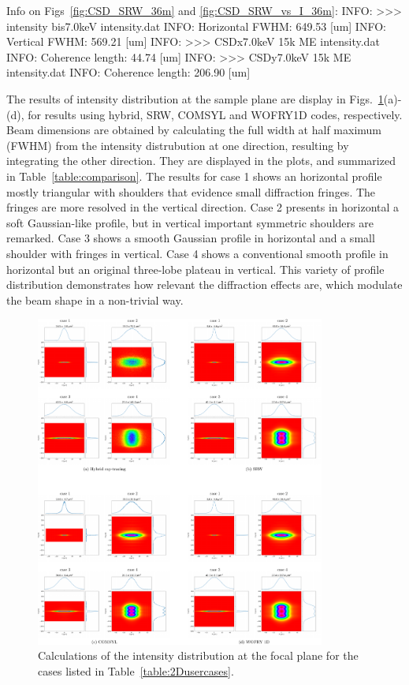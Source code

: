 \documentclass{iucr}              %
\newcommand{\inred}[1]{{\color{red}#1}}
\begin{document}
\inred{Info on Figs~\ref{fig:CSD_SRW_36m} and \ref{fig:CSD_SRW_vs_I_36m}:}
INFO: >>> intensity bis7.0keV intensity.dat
INFO: Horizontal FWHM: 649.53 [um]
INFO: Vertical FWHM: 569.21 [um]
INFO: >>> CSDx7.0keV 15k ME intensity.dat
INFO: Coherence length: 44.74 [um]
INFO: >>> CSDy7.0keV 15k ME intensity.dat
INFO: Coherence length: 206.90 [um]


The results of intensity distribution at the sample plane are display in Figs.~\ref{fig:sim_results}(a)-(d), for results using hybrid, SRW, COMSYL and WOFRY1D codes, respectively.  Beam dimensions are obtained by calculating the full width at half maximum (FWHM) from the intensity distrubution at one direction, resulting by integrating the other direction. They are displayed in the plots, and summarized in Table~\ref{table:comparison}.
The results for case 1 shows an horizontal profile mostly triangular with shoulders that evidence small diffraction fringes. The fringes are more resolved in the vertical direction. Case 2  presents in horizontal a soft Gaussian-like profile, but in vertical important symmetric shoulders are remarked. Case 3 shows a smooth Gaussian profile in horizontal and a small shoulder with fringes in vertical. Case 4 shows a conventional smooth profile in horizontal but an original three-lobe plateau in vertical. This variety of profile distribution demonstrates how relevant the diffraction effects are, which modulate the beam shape in a non-trivial way.  

\newpage
\onecolumn

\begin{figure}
    \label{fig:sim_results}
    \includegraphics[width=0.85\textwidth]{figures/fig_sim_results.pdf}
    \caption{Calculations of the intensity distribution at the focal plane for the cases listed in Table~\ref{table:2Dusercases}.}
\end{figure}
\end{document}

